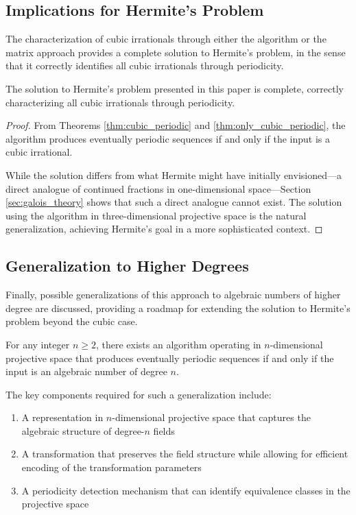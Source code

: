 \subsection{Implications for Hermite's Problem}

The characterization of cubic irrationals through either the \HAPD{} algorithm or the matrix approach provides a complete solution to Hermite's problem, in the sense that it correctly identifies all cubic irrationals through periodicity.

\begin{theorem}
The solution to Hermite's problem presented in this paper is complete, correctly characterizing all cubic irrationals through periodicity.
\end{theorem}

\begin{proof}
From Theorems \ref{thm:cubic_periodic} and \ref{thm:only_cubic_periodic}, the \HAPD{} algorithm produces eventually periodic sequences if and only if the input is a cubic irrational.

While the solution differs from what Hermite might have initially envisioned—a direct analogue of continued fractions in one-dimensional space—Section \ref{sec:galois_theory} shows that such a direct analogue cannot exist. The solution using the \HAPD{} algorithm in three-dimensional projective space is the natural generalization, achieving Hermite's goal in a more sophisticated context.
\end{proof}

\subsection{Generalization to Higher Degrees}

Finally, possible generalizations of this approach to algebraic numbers of higher degree are discussed, providing a roadmap for extending the solution to Hermite's problem beyond the cubic case.

\begin{conjecture}
For any integer $n \geq 2$, there exists an algorithm operating in $n$-dimensional projective space that produces eventually periodic sequences if and only if the input is an algebraic number of degree $n$.
\end{conjecture}

The key components required for such a generalization include:

\begin{enumerate}
\item A representation in $n$-dimensional projective space that captures the algebraic structure of degree-$n$ fields
\item A transformation that preserves the field structure while allowing for efficient encoding of the transformation parameters
\item A periodicity detection mechanism that can identify equivalence classes in the projective space
\end{enumerate}

